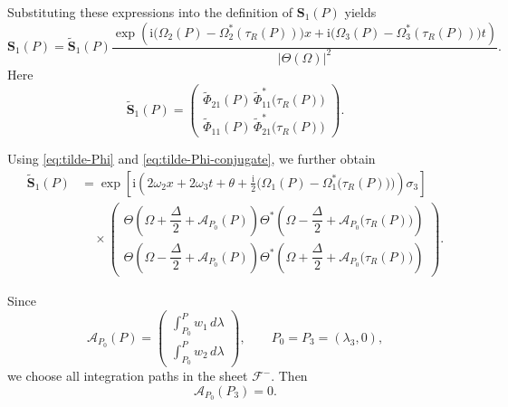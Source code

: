 \documentclass{amsart}
\numberwithin{equation}{hw}
\begin{document}
Substituting these expressions into the definition of \(\bm{S}_1(P)\) yields
\begin{equation}
\bm{S}_1(P)
=
\widetilde{\bm{S}}_1(P)
\frac{
\exp\!\left(
\mathrm{i}
\bigl(
\Omega_2(P)-\Omega_2^*(\tau_R(P))
\bigr)x
+
\mathrm{i}
\bigl(
\Omega_3(P)-\Omega_3^*(\tau_R(P))
\bigr)t
\right)
}{
|\Theta(\Omega)|^2
}.
\label{eq:S1-factorization}
\end{equation}
Here
\begin{equation}
\widetilde{\bm{S}}_1(P)
=
\begin{pmatrix}
\widetilde{\Phi}_{21}(P)\,
\widetilde{\Phi}_{11}^*\bigl(\tau_R(P)\bigr)
\\[8pt]
\widetilde{\Phi}_{11}(P)\,
\widetilde{\Phi}_{21}^*\bigl(\tau_R(P)\bigr)
\end{pmatrix}.
\label{eq:tilde-S1}
\end{equation}

Using \eqref{eq:tilde-Phi} and \eqref{eq:tilde-Phi-conjugate}, we further obtain
\begin{align}
\widetilde{\bm{S}}_1(P)
&=
\exp\!\left[
\mathrm{i}
\left(
2\omega_2x
+
2\omega_3t
+
\theta
+
\frac{\mathrm{i}}{2}
\bigl(
\Omega_1(P)-\Omega_1^*\bigl(\tau_R(P)\bigr)
\bigr)
\right)
\sigma_3
\right]
\nonumber\\[4pt]
&\quad\times
\begin{pmatrix}
\Theta\!\left(
\Omega+\dfrac{\Delta}{2}
+\mathcal{A}_{P_0}(P)
\right)
\Theta^*\!\left(
\Omega-\dfrac{\Delta}{2}
+\mathcal{A}_{P_0}\bigl(\tau_R(P)\bigr)
\right)
\\[10pt]
\Theta\!\left(
\Omega-\dfrac{\Delta}{2}
+\mathcal{A}_{P_0}(P)
\right)
\Theta^*\!\left(
\Omega+\dfrac{\Delta}{2}
+\mathcal{A}_{P_0}\bigl(\tau_R(P)\bigr)
\right)
\end{pmatrix}.
\label{eq:tilde-S1-expanded}
\end{align}

Since
\begin{equation}
\mathcal{A}_{P_0}(P)
=
\begin{pmatrix}
\displaystyle \int_{P_0}^{P} w_1\,d\lambda \\[10pt]
\displaystyle \int_{P_0}^{P} w_2\,d\lambda
\end{pmatrix},
\qquad
P_0=P_3=(\lambda_3,0),
\label{eq:Abel-map-components}
\end{equation}
we choose all integration paths in the sheet \(\mathscr{F}^-\). Then
\begin{equation}
\mathcal{A}_{P_0}(P_3)=0.
\label{eq:A-P3}
\end{equation}
\end{document}
